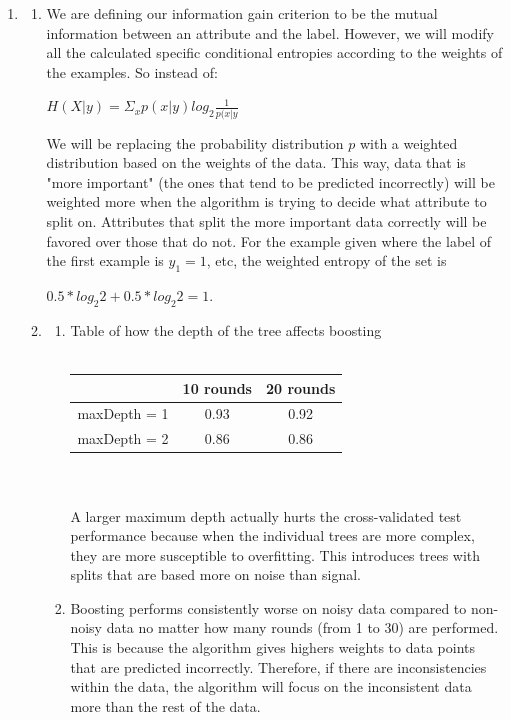 \documentclass[12pt]{article}
\begin{document}
\begin{enumerate}
	\item
		\begin{enumerate}
			\item We are defining our information gain criterion to be the mutual information between an attribute and the label. However, we will modify all the calculated specific conditional entropies according to the weights of the examples. So instead of:
				\begin{center}
				$H(X|y) = \Sigma_x p(x|y) log_2 \frac{1}{p(x|y}$
				\end{center}
				We will be replacing the probability distribution $p$ with a weighted distribution based on the weights of the data. This way, data that is "more important" (the ones that tend to be predicted incorrectly) will be weighted more when the algorithm is trying to decide what attribute to split on. Attributes that split the more important data correctly will be favored over those that do not. For the example given where the label of the first example is $y_1 = 1$, etc, the weighted entropy of the set is 
				\begin{center}
				$0.5*log_{2}2 + 0.5*log_{2}2 = 1$.
				\end{center}
			\item
				\begin{enumerate}
					\item 
						Table of how the depth of the tree affects boosting\\\\
    							\begin{tabular}{|c|c|c|}
        							\hline
        							~            & 10 rounds & 20 rounds \\ \hline
        							maxDepth = 1 & 0.93      & 0.92      \\ 
        							maxDepth = 2 & 0.86      & 0.86      \\
        						\hline
    							\end{tabular}
						\\\\A larger maximum depth actually hurts the cross-validated test performance because when the individual trees are more complex, they are more susceptible to overfitting. This introduces trees with splits that are based more on noise than signal.
					\item 
						Boosting performs consistently worse on noisy data compared to non-noisy data no matter how many rounds (from 1 to 30) are performed. This is because the algorithm gives highers weights to data points that are predicted incorrectly. Therefore, if there are inconsistencies within the data, the algorithm will focus on the inconsistent data more than the rest of the data.

\end{enumerate}
\end{enumerate}
\end{enumerate}
\end{document}
